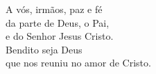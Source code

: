 A vós, irmãos, paz e fé \\ da parte de Deus, o Pai, \\ e do Senhor Jesus Cristo. \\
\RbarRed{} Bendito seja Deus \\ que nos reuniu no amor de Cristo.
\vspace{.2cm} \\
